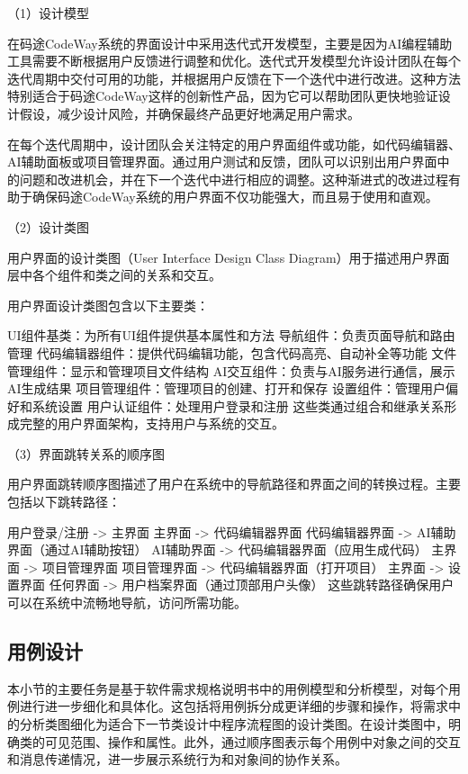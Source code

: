 \documentclass[
    report,     %
    oneside,    %
    UTF8,       %
    zihao=-4    %
]{config} %
\begin{document}
（1）设计模型

在码途CodeWay系统的界面设计中采用迭代式开发模型，主要是因为AI编程辅助工具需要不断根据用户反馈进行调整和优化。迭代式开发模型允许设计团队在每个迭代周期中交付可用的功能，并根据用户反馈在下一个迭代中进行改进。这种方法特别适合于码途CodeWay这样的创新性产品，因为它可以帮助团队更快地验证设计假设，减少设计风险，并确保最终产品更好地满足用户需求。

在每个迭代周期中，设计团队会关注特定的用户界面组件或功能，如代码编辑器、AI辅助面板或项目管理界面。通过用户测试和反馈，团队可以识别出用户界面中的问题和改进机会，并在下一个迭代中进行相应的调整。这种渐进式的改进过程有助于确保码途CodeWay系统的用户界面不仅功能强大，而且易于使用和直观。

（2）设计类图

用户界面的设计类图（User Interface Design Class Diagram）用于描述用户界面层中各个组件和类之间的关系和交互。

用户界面设计类图包含以下主要类：

UI组件基类：为所有UI组件提供基本属性和方法
导航组件：负责页面导航和路由管理
代码编辑器组件：提供代码编辑功能，包含代码高亮、自动补全等功能
文件管理组件：显示和管理项目文件结构
AI交互组件：负责与AI服务进行通信，展示AI生成结果
项目管理组件：管理项目的创建、打开和保存
设置组件：管理用户偏好和系统设置
用户认证组件：处理用户登录和注册
这些类通过组合和继承关系形成完整的用户界面架构，支持用户与系统的交互。

（3）界面跳转关系的顺序图

用户界面跳转顺序图描述了用户在系统中的导航路径和界面之间的转换过程。主要包括以下跳转路径：

用户登录/注册 -> 主界面
主界面 -> 代码编辑器界面
代码编辑器界面 -> AI辅助界面（通过AI辅助按钮）
AI辅助界面 -> 代码编辑器界面（应用生成代码）
主界面 -> 项目管理界面
项目管理界面 -> 代码编辑器界面（打开项目）
主界面 -> 设置界面
任何界面 -> 用户档案界面（通过顶部用户头像）
这些跳转路径确保用户可以在系统中流畅地导航，访问所需功能。
\subsection{用例设计}

本小节的主要任务是基于软件需求规格说明书中的用例模型和分析模型，对每个用例进行进一步细化和具体化。这包括将用例拆分成更详细的步骤和操作，将需求中的分析类图细化为适合下一节类设计中程序流程图的设计类图。在设计类图中，明确类的可见范围、操作和属性。此外，通过顺序图表示每个用例中对象之间的交互和消息传递情况，进一步展示系统行为和对象间的协作关系。
\end{document}
